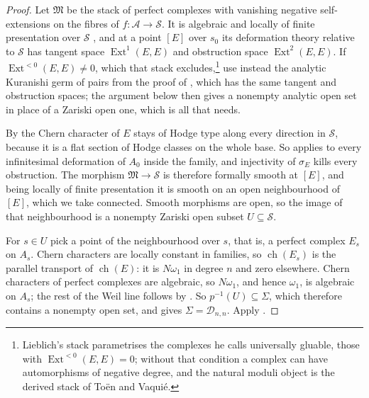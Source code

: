 \documentclass[11pt,reqno]{amsart}
\theoremstyle{plain}
\theoremstyle{definition}
\theoremstyle{remark}
\newcommand{\cA}{\mathcal{A}}
\newcommand{\cD}{\mathcal{D}}
\newcommand{\cS}{\mathcal{S}}
\DeclareMathOperator{\ch}{ch}
\DeclareMathOperator{\Ext}{Ext}
\begin{document}
\begin{proof}
Let $\mathfrak{M}$ be the stack of perfect complexes with vanishing negative
self-extensions on the fibres of $f\colon\cA\to\cS$. It is algebraic and
locally of finite presentation over $\cS$ \cite{Lie06}, and at a point $[E]$
over $s_{0}$ its deformation theory relative to $\cS$ has tangent space
$\Ext^{1}(E,E)$ and obstruction space $\Ext^{2}(E,E)$. If
$\Ext^{<0}(E,E)\ne0$, which that stack excludes,\footnote{Lieblich's
stack parametrises the complexes he calls universally gluable, those with
$\Ext^{<0}(E,E)=0$; without that condition a complex can have automorphisms
of negative degree, and the natural moduli object is the derived stack of
To\"en and Vaqui\'e.} use instead the analytic Kuranishi germ of pairs from
the proof of , which has the same tangent and obstruction
spaces; the argument below then gives a nonempty analytic open set in place of
a Zariski open one, which is all that \cite[Corollary~16.5]{paperI} needs.

By  the Chern character of $E$ stays of Hodge type along
every direction in $\cS$, because it is a flat section of Hodge classes on the
whole base. So  applies to every infinitesimal deformation of
$A_{0}$ inside the family, and injectivity of $\sigma_{E}$ kills every
obstruction. The morphism $\mathfrak{M}\to\cS$ is therefore formally smooth at
$[E]$, and being locally of finite presentation it is smooth on an open
neighbourhood of $[E]$, which we take connected. Smooth morphisms are open,
so the image of that neighbourhood is a nonempty Zariski open subset
$U\subseteq\cS$.

For $s\in U$ pick a point of the neighbourhood over $s$, that is, a perfect
complex $E_{s}$ on $A_{s}$. Chern characters are locally constant in
families, so $\ch(E_{s})$ is the parallel transport of $\ch(E)$: it is
$N\omega_{1}$ in degree $n$ and zero elsewhere. Chern characters of perfect
complexes are algebraic, so $N\omega_{1}$, and hence $\omega_{1}$, is
algebraic on $A_{s}$; the rest of the Weil line follows by
\cite[Lemma~16.3]{paperI}. So $p^{-1}(U)\subseteq\Sigma$, which therefore
contains a nonempty open set, and \cite[Corollary~16.5]{paperI} gives
$\Sigma=\cD_{n,n}$. Apply \cite[Theorem~15.14(a)]{paperI}.
\end{proof}
\end{document}

